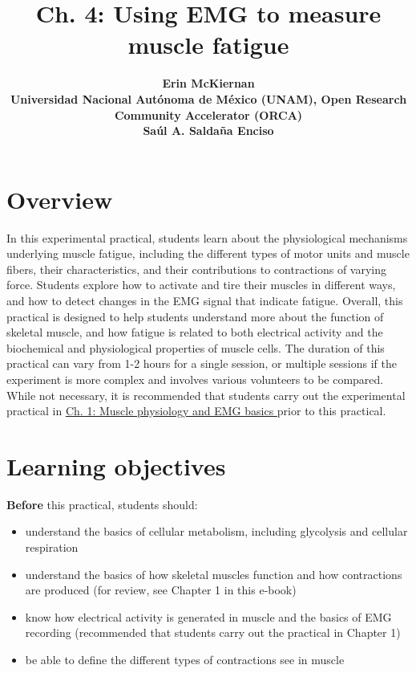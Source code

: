 \documentclass{article}
\title{Ch. 4: Using EMG to measure muscle fatigue}
\date{\displaydate{articleDate}}
\author{\bfseries Erin McKiernan\mdseries\\Universidad Nacional Autónoma de México (UNAM), Open Research Community Accelerator (ORCA)\\\AND\bfseries Saúl A. Saldaña Enciso\mdseries\\}
\begin{document}
\maketitle
\keywords{}

\section{Overview}

In this experimental practical, students learn about the physiological mechanisms underlying muscle fatigue, including the different types of motor units and muscle fibers, their characteristics, and their contributions to contractions of varying force. Students explore how to activate and tire their muscles in different ways, and how to detect changes in the EMG signal that indicate fatigue. Overall, this practical is designed to help students understand more about the function of skeletal muscle, and how fatigue is related to both electrical activity and the biochemical and physiological properties of muscle cells. The duration of this practical can vary from 1-2 hours for a single session, or multiple sessions if the experiment is more complex and involves various volunteers to be compared. While not necessary, it is recommended that students carry out the experimental practical in \href{https://curvenote.com/oxa:EPpXta8zJdzN048lz8AR/hZTnTYzQR5EQmCKX51Wj}{Ch. 1: Muscle physiology and EMG basics }prior to this practical.

\section{Learning objectives}

\textbf{Before} this practical, students should:

\begin{itemize}
\item understand the basics of cellular metabolism, including glycolysis and cellular respiration
\item understand the basics of how skeletal muscles function and how contractions are produced (for review, see Chapter 1 in this e-book)
\item know how electrical activity is generated in muscle and the basics of EMG recording (recommended that students carry out the practical in Chapter 1)
\item be able to define the different types of contractions see in muscle
\end{itemize}
\end{document}

